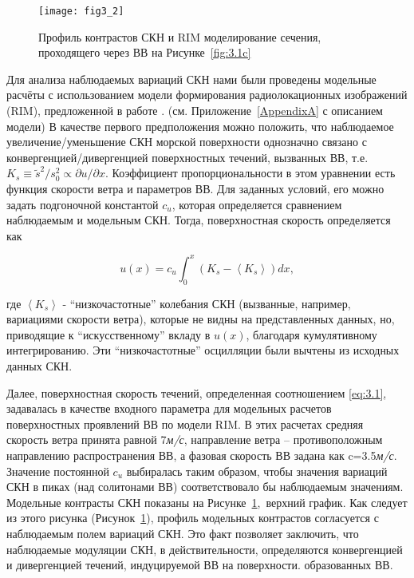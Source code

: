 {\begin{figure}[H]
    \texttt{[image: fig3\_2]}
    \caption{Профиль контрастов СКН и RIM моделирование сечения, проходящего через ВВ на Рисунке~\ref{fig:3.1c}}
    \label{fig:3.2}
\end{figure}


Для анализа наблюдаемых вариаций СКН нами были проведены модельные расчёты с использованием модели формирования радиолокационных изображений (RIM), предложенной в работе \citep{Kudryavtsev2005}. (см. Приложение~\ref{AppendixA} с описанием модели) В качестве первого предположения можно положить, что наблюдаемое увеличение/уменьшение СКН морской поверхности однозначно связано с конвергенцией/дивергенцией поверхностных течений, вызванных ВВ, т.е. $K_{s} \equiv \tilde{s}^{2} /s_{0}^{2} \propto \partial u/\partial x$. Коэффициент пропорциональности в этом уравнении есть функция скорости ветра и параметров ВВ. Для заданных условий, его можно задать подгоночной константой $c_{u} $, которая определяется сравнением наблюдаемым и модельным СКН. Тогда, поверхностная скорость определяется как



\begin{equation} \label{eq:3.1} u(x)=c_{u} \int _{0}^{x}\left(K_{s} -\left\langle K_{s} \right\rangle \right)dx ,  \end{equation} 



\noindent где $\left\langle K_{s} \right\rangle $ - ``низкочастотные'' колебания СКН (вызванные, например, вариациями скорости ветра), которые не видны на представленных данных, но, приводящие к ``искусственному'' вкладу в $u(x)$, благодаря кумулятивному интегрированию. Эти ``низкочастотные'' осцилляции были вычтены из исходных данных СКН.

Далее, поверхностная скорость течений, определенная соотношением \eqref{eq:3.1}, задавалась в качестве входного параметра для модельных расчетов поверхностных проявлений ВВ по модели RIM. В этих расчетах средняя скорость ветра принята равной 7\textit{м/с}, направление ветра -- противоположным направлению распространения ВВ, а фазовая скорость ВВ задана как c=3.5\textit{м/с}. Значение постоянной $c_{u} $ выбиралась таким образом, чтобы значения вариаций СКН в пиках (над солитонами ВВ) соответствовало бы наблюдаемым значениям. Модельные контрасты СКН показаны на Рисунке~\ref{fig:3.2},~верхний график. Как следует из этого рисунка (Рисунок~\ref{fig:3.2}), профиль модельных контрастов согласуется с наблюдаемым полем вариаций СКН. Это факт позволяет заключить, что наблюдаемые модуляции СКН, в действительности, определяются конвергенцией и дивергенцией течений, индуцируемой ВВ на поверхности. образованных ВВ.

}
